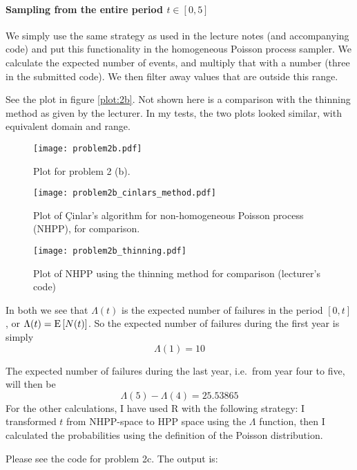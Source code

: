 \documentclass[a4paper,english,12pt]{article}
\begin{document}
\paragraph{Sampling from the entire period $t \in [0,5]$}
We simply use the same strategy as used in the lecture notes (and accompanying
code) and put this functionality in the homogeneous Poisson process sampler.
We calculate the expected number of events, and multiply that with a number
(three in the submitted code). We then filter away values that are outside this
range.

See the plot in figure \vref{plot:2b}. Not shown here is a comparison with the
thinning method as given by the lecturer. In my tests, the two plots looked
similar, with equivalent domain and range.

\begin{figure}
  \centering
  \texttt{[image: problem2b.pdf]}
  \caption{Plot for problem 2 (b).}
  \label{plot:2b}
\end{figure}

\begin{figure}
  \centering
  \texttt{[image: problem2b\_cinlars\_method.pdf]}
  \caption{Plot of Çinlar's algorithm for non-homogeneous Poisson process
  (NHPP), for comparison.}
  \label{plot:cinlar}
\end{figure}

\begin{figure}
  \centering
  \texttt{[image: problem2b\_thinning.pdf]}
  \caption{Plot of NHPP using the thinning method for comparison (lecturer's code)}
  \label{plot:thinning}
\end{figure}

In both \cite{generating,rizzo} we see that $\Lambda(t)$ is the expected number of
failures in the period $[0, t]$, or $\Lambda(t) = \mathrm{E}\left[ N(t) \right]$. So
the expected number of failures during the first year is simply
\[
  \Lambda(1) = 10
\]

The expected number of failures during the last year, i.e.~from year four to
five, will then be
\[
  \Lambda(5) - \Lambda(4) = 25.53865
\]
For the other calculations, I have used R with the following strategy: I
transformed $t$ from NHPP-space to HPP space using the $\Lambda$ function, then
I calculated the probabilities using the definition of the Poisson
distribution.

Please see the code for problem 2c.  The output is:
\end{document}
